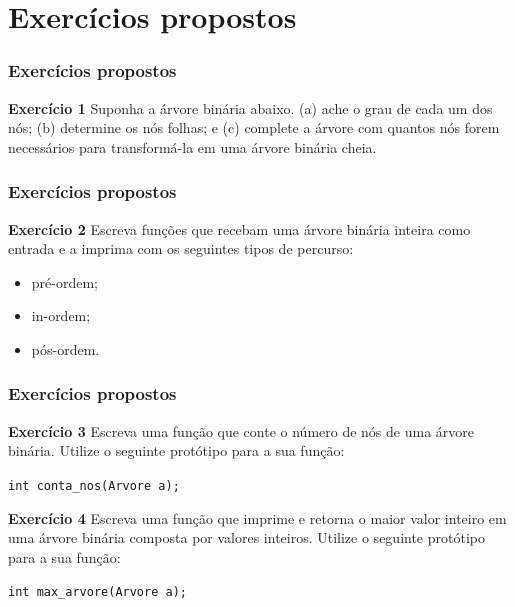 \documentclass{beamer}
\begin{document}
\section{Exercícios propostos}

\begin{frame}
  \frametitle{Exercícios propostos}

  \textbf{Exercício 1} Suponha a árvore binária abaixo. (a) ache o grau
  de cada um dos nós; (b) determine os nós folhas; e (c) complete a 
  árvore com quantos nós forem necessários para transformá-la em uma
  árvore binária cheia.
      
  \centering
\end{frame}

\begin{frame}
  \frametitle{Exercícios propostos}

  \textbf{Exercício 2} Escreva funções que recebam uma árvore binária
  inteira como entrada e a imprima com os seguintes tipos de percurso:

  \begin{itemize}
    \item pré-ordem;
    \item in-ordem;
    \item pós-ordem.
  \end{itemize}
\end{frame}

\begin{frame}
  \frametitle{Exercícios propostos}

  \textbf{Exercício 3} Escreva uma função que conte o número de nós
  de uma árvore binária. Utilize o seguinte protótipo para a sua função:

  \texttt{int conta\_nos(Arvore \*a);}
  
  \vspace{1cm}

  \textbf{Exercício 4} Escreva uma função que imprime e retorna o maior
  valor inteiro em uma árvore binária composta por valores inteiros. 
  Utilize o seguinte protótipo para a sua função:

  \texttt{int max\_arvore(Arvore \*a);}

\end{frame}
\end{document}
